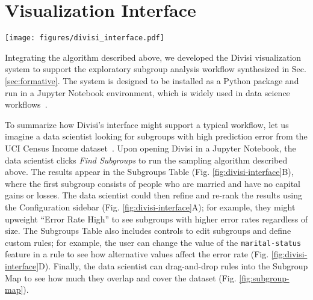 \section{Visualization Interface}
\begin{figure*}
    \centering
    \texttt{[image: figures/divisi\_interface.pdf]}
    \caption{The Configuration sidebar (A) and the Subgroups Table (B) allow users to run the subgroup discovery algorithm and browse the rules it returns. For example, in the Census Income dataset, the first returned subgroup (C) represents people with no capital gains or losses who are married to a civilian spouse. This subgroup comprises 38\% of the dataset, and has an error rate of 25.3\%, compared to 11.6\% in the overall Evaluation Set. By clicking the dropdown next to the \texttt{marital-status} feature (D), we can test alternative values for that feature.}
    \label{fig:divisi-interface}
\end{figure*}

Integrating the algorithm described above, we developed the Divisi visualization system to support the exploratory subgroup analysis workflow synthesized in Sec. \ref{sec:formative}.
The system is designed to be installed as a Python package and run in a Jupyter Notebook environment, which is widely used in data science workflows~\cite{shen_interactive_2014}.

To summarize how Divisi's interface might support a typical workflow, let us imagine a data scientist looking for subgroups with high prediction error from the UCI Census Income dataset~\cite{adult_2}.
Upon opening Divisi in a Jupyter Notebook, the data scientist clicks \textit{Find Subgroups} to run the sampling algorithm described above. 
The results appear in the Subgroups Table (Fig. \ref{fig:divisi-interface}B), where the first subgroup consists of people who are married and have no capital gains or losses. 
The data scientist could then refine and re-rank the results using the Configuration sidebar (Fig. \ref{fig:divisi-interface}A); for example, they might upweight ``Error Rate High'' to see subgroups with higher error rates regardless of size. 
The Subgroups Table also includes controls to edit subgroups and define custom rules; for example, the user can change the value of the \texttt{marital-status} feature in a rule to see how alternative values affect the error rate (Fig. \ref{fig:divisi-interface}D).
Finally, the data scientist can drag-and-drop rules into the Subgroup Map to see how much they overlap and cover the dataset (Fig. \ref{fig:subgroup-map}).


